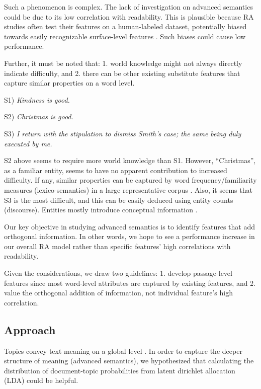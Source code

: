 \documentclass[11pt]{article}
\begin{document}
Such a phenomenon is complex. The lack of investigation on advanced semantics could be due to its low correlation with readability. This is plausible because RA studies often test their features on a human-labeled dataset, potentially biased towards easily recognizable surface-level features \citep{evans2006cognitive}. Such biases could cause low performance.

Further, it must be noted that: 1. world knowledge might not always directly indicate difficulty, and 2. there can be other existing substitute features that capture similar properties on a word level.

\noindent
S1) \textit{Kindness is good.}

\noindent
S2) \textit{Christmas is good.}

\noindent
S3) \textit{I return with the stipulation to dismiss Smith's} \hspace*{5mm} \textit{case; the same being duly executed by me.}

S2 above seems to require more world knowledge than S1. However, ``Christmas'', as a familiar entity, seems to have no apparent contribution to increased difficulty. If any, similar properties can be captured by word frequency/familiarity measures (lexico-semantics) in a large representative corpus \citep{gondy:13}. Also, it seems that S3 is the most difficult, and this can be easily deduced using entity counts (discourse). Entities mostly introduce conceptual information \citep{Feng:10}.

Our key objective in studying advanced semantics is to identify features that add orthogonal information. In other words, we hope to see a performance increase in our overall RA model rather than specific features' high correlations with readability. 

Given the considerations, we draw two guidelines: 1. develop passage-level features since most word-level attributes are captured by existing features, and 2. value the orthogonal addition of information, not individual feature's high correlation.

\subsection{Approach}
Topics convey text meaning on a global level \citep{holtgraves1999comprehending}. In order to capture the deeper structure of meaning (advanced semantics), we hypothesized that calculating the distribution of document-topic probabilities from latent dirichlet allocation (LDA) \citep{Blei:03} could be helpful. 
\end{document}
